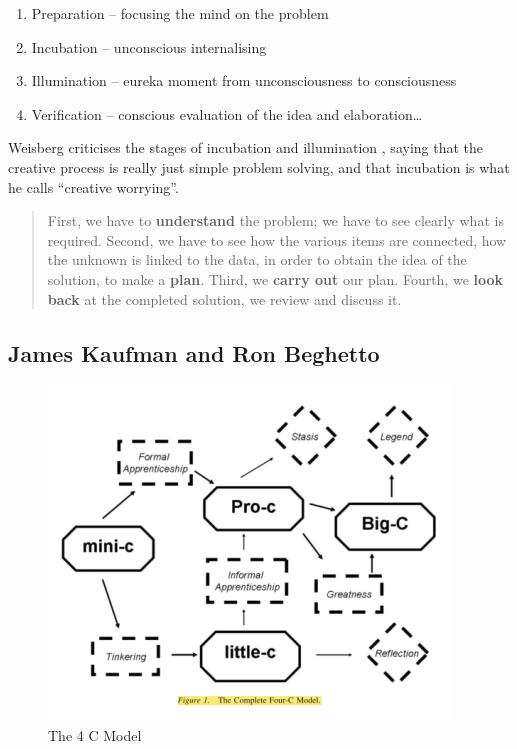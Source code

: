 \begin{enumerate}
  \item Preparation – focusing the mind on the problem
  \item Incubation – unconscious internalising
  \item Illumination – eureka moment from unconsciousness to consciousness
  \item Verification – conscious evaluation of the idea and elaboration…
\end{enumerate}

Weisberg criticises the stages of incubation and illumination \citep[referred to by][]{Partridge1994}, saying that the creative process is really just simple problem solving, and that incubation is what he calls ``creative worrying''.

\begin{quote}
  First, we have to \textbf{understand} the problem; we have to see clearly what is required. Second, we have to see how the various items are connected, how the unknown is linked to the data, in order to obtain the idea of the solution, to make a \textbf{plan}. Third, we \textbf{carry out} our plan. Fourth, we \textbf{look back} at the completed solution, we review and discuss it. \citep[p.5-6, his emphasis]{Polya1957}
\end{quote}

\subsection{James Kaufman and Ron Beghetto}

\begin{figure}[htb] %
  \centering
  \includegraphics[width=\linewidth]{images/4C.png}
\caption[The 4 C Model]{The 4 C Model}
\label{fig:4C}
\end{figure}

